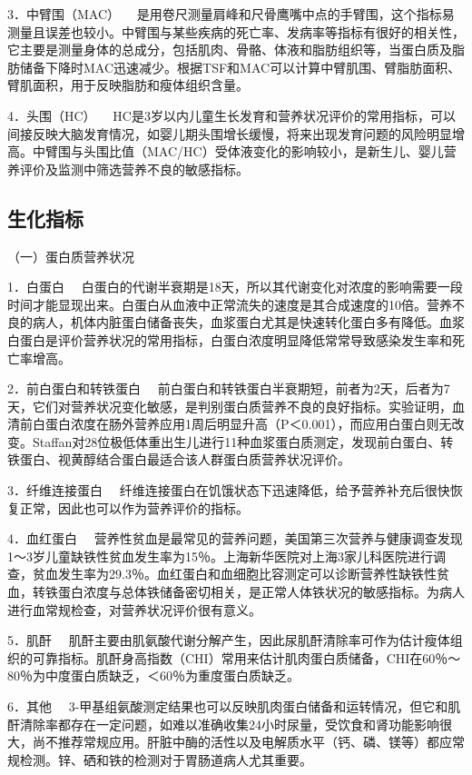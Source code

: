 {3．中臂围（MAC）}
　是用卷尺测量肩峰和尺骨鹰嘴中点的手臂围，这个指标易测量且误差也较小。中臂围与某些疾病的死亡率、发病率等指标有很好的相关性，它主要是测量身体的总成分，包括肌肉、骨骼、体液和脂肪组织等，当蛋白质及脂肪储备下降时MAC迅速减少。根据TSF和MAC可以计算中臂肌围、臂脂肪面积、臂肌面积，用于反映脂肪和瘦体组织含量。

{4．头围（HC）}
　HC是3岁以内儿童生长发育和营养状况评价的常用指标，可以间接反映大脑发育情况，如婴儿期头围增长缓慢，将来出现发育问题的风险明显增高。中臂围与头围比值（MAC/HC）受体液变化的影响较小，是新生儿、婴儿营养评价及监测中筛选营养不良的敏感指标。

\hypertarget{text00002.htmlux5cux23mllj7}{%
\subsection{生化指标}\label{text00002.htmlux5cux23mllj7}}

（一）蛋白质营养状况

{1．白蛋白}
　白蛋白的代谢半衰期是18天，所以其代谢变化对浓度的影响需要一段时间才能显现出来。白蛋白从血液中正常流失的速度是其合成速度的10倍。营养不良的病人，机体内脏蛋白储备丧失，血浆蛋白尤其是快速转化蛋白多有降低。血浆白蛋白是评价营养状况的常用指标，白蛋白浓度明显降低常常导致感染发生率和死亡率增高。

{2．前白蛋白和转铁蛋白}
　前白蛋白和转铁蛋白半衰期短，前者为2天，后者为7天，它们对营养状况变化敏感，是判别蛋白质营养不良的良好指标。实验证明，血清前白蛋白浓度在肠外营养应用1周后明显升高（P＜0.001），而应用白蛋白则无改变。Staffan对28位极低体重出生儿进行11种血浆蛋白质测定，发现前白蛋白、转铁蛋白、视黄醇结合蛋白最适合该人群蛋白质营养状况评价。

{3．纤维连接蛋白}
　纤维连接蛋白在饥饿状态下迅速降低，给予营养补充后很快恢复正常，因此也可以作为营养评价的指标。

{4．血红蛋白}
　营养性贫血是最常见的营养问题，美国第三次营养与健康调查发现1～3岁儿童缺铁性贫血发生率为15％。上海新华医院对上海3家儿科医院进行调查，贫血发生率为29.3％。血红蛋白和血细胞比容测定可以诊断营养性缺铁性贫血，转铁蛋白浓度与总体铁储备密切相关，是正常人体铁状况的敏感指标。为病人进行血常规检查，对营养状况评价很有意义。

{5．肌酐}
　肌酐主要由肌氨酸代谢分解产生，因此尿肌酐清除率可作为估计瘦体组织的可靠指标。肌酐身高指数（CHI）常用来估计肌肉蛋白质储备，CHI在60％～80％为中度蛋白质缺乏，＜60％为重度蛋白质缺乏。

{6．其他}
　3-甲基组氨酸测定结果也可以反映肌肉蛋白储备和运转情况，但它和肌酐清除率都存在一定问题，如难以准确收集24小时尿量，受饮食和肾功能影响很大，尚不推荐常规应用。肝脏中酶的活性以及电解质水平（钙、磷、镁等）都应常规检测。锌、硒和铁的检测对于胃肠道病人尤其重要。

